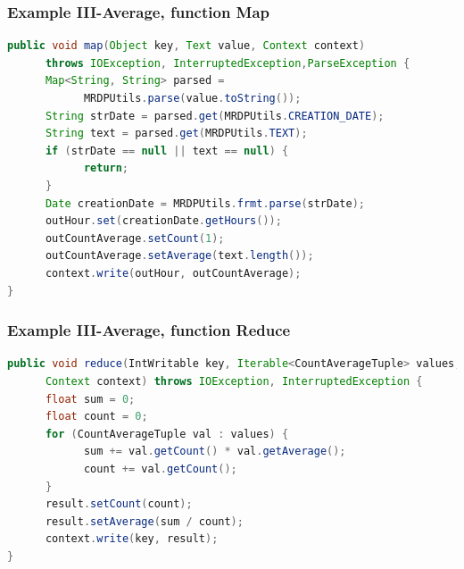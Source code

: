 \documentclass[xcolor=dvipsnames,dvip,notes=show,table]{beamer}
\begin{document}



\begin{frame}[fragile]
  \frametitle{Example III-Average, function Map}

\begin{lstlisting}[language=Java]
public void map(Object key, Text value, Context context)
      throws IOException, InterruptedException,ParseException {
      Map<String, String> parsed = 
            MRDPUtils.parse(value.toString());
      String strDate = parsed.get(MRDPUtils.CREATION_DATE);
      String text = parsed.get(MRDPUtils.TEXT);
      if (strDate == null || text == null) {
            return;
      }
      Date creationDate = MRDPUtils.frmt.parse(strDate);
      outHour.set(creationDate.getHours());
      outCountAverage.setCount(1);
      outCountAverage.setAverage(text.length());
      context.write(outHour, outCountAverage);
}
\end{lstlisting}

\end{frame}

\begin{frame}[fragile]
  \frametitle{Example III-Average, function Reduce}

\begin{lstlisting}[language=Java]
public void reduce(IntWritable key, Iterable<CountAverageTuple> values,
      Context context) throws IOException, InterruptedException {
      float sum = 0;
      float count = 0;
      for (CountAverageTuple val : values) {
            sum += val.getCount() * val.getAverage();
            count += val.getCount();
      }
      result.setCount(count);
      result.setAverage(sum / count);
      context.write(key, result);
}
\end{lstlisting}

\end{frame}
\end{document}
